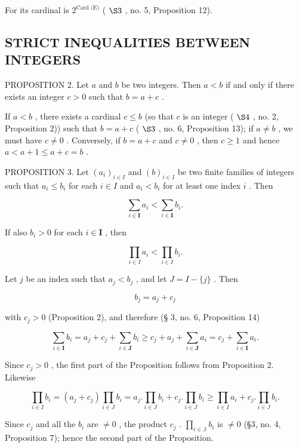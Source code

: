 For its cardinal is \(2^{\text{Card (E)}}\) ( \(\S 3\) , no. 5, Proposition 12).

\subsection{STRICT INEQUALITIES BETWEEN INTEGERS}

PROPOSITION 2. Let \(a\) and \(b\) be two integers. Then \(a < b\) if and only if there exists an integer \(c > 0\) such that \(b = a + c\) .

If \(a < b\) , there exists a cardinal \(c \leqslant b\) (so that \(c\) is an integer ( \(\S 4\) , no. 2, Proposition 2)) such that \(b = a + c\) ( \(\S 3\) , no. 6, Proposition 13); if \(a \neq b\) , we must have \(c \neq 0\) . Conversely, if \(b = a + c\) and \(c \neq 0\) , then \(c \geqslant 1\) and hence \(a < a + 1 \leqslant a + c = b\) .

PROPOSITION 3. Let \((a_i)_{i \in I}\) and \((b)_{i \in I}\) be two finite families of integers such that \(a_i \leqslant b_i\) for each \(i \in I\) and \(a_i < b_i\) for at least one index \(i\) . Then

\[
\sum_ {i \in \mathbf {I}} a _ {i} <   \sum_ {i \in \mathbf {I}} b _ {i}.
\]

If also \(b_{i} > 0\) for each \(i \in \mathbf{I}\) , then

\[
\prod_ {i \in I} a _ {i} <   \prod_ {i \in I} b _ {i}.
\]

Let \(j\) be an index such that \(a_{j} < b_{j}\) , and let \(J = I - \{j\}\) . Then

\[
b _ {j} = a _ {j} + c _ {j}
\]

with \(c_{j} > 0\) (Proposition 2), and therefore (§ 3, no. 6, Proposition 14)

\[
\sum_ {i \in \mathbf {I}} b _ {i} = a _ {j} + c _ {j} + \sum_ {i \in \mathbf {J}} b _ {i} \geqslant c _ {j} + a _ {j} + \sum_ {i \in \mathbf {J}} a _ {i} = c _ {j} + \sum_ {i \in \mathbf {I}} a _ {i}.
\]

Since \(c_{j} > 0\) , the first part of the Proposition follows from Proposition 2. Likewise

\[
\prod_ {i \in I} b _ {i} = (a _ {j} + c _ {j}) \prod_ {i \in J} b _ {i} = a _ {j}. \prod_ {i \in J} b _ {i} + c _ {j}. \prod_ {i \in J} b _ {i} \geqslant \prod_ {i \in I} a _ {i} + c _ {j}. \prod_ {i \in J} b _ {i}.
\]

Since \(c_{j}\) and all the \(b_{i}\) are \(\neq 0\) , the product \(c_{j}\) . \(\prod_{i \in \mathbb{J}} b_{i}\) is \(\neq 0\) (§3, no. 4, Proposition 7); hence the second part of the Proposition.

